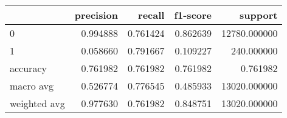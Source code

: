 \begin{tabular}{lrrrr}
\toprule
{} &  precision &    recall &  f1-score &       support \\
\midrule
0            &   0.994888 &  0.761424 &  0.862639 &  12780.000000 \\
1            &   0.058660 &  0.791667 &  0.109227 &    240.000000 \\
accuracy     &   0.761982 &  0.761982 &  0.761982 &      0.761982 \\
macro avg    &   0.526774 &  0.776545 &  0.485933 &  13020.000000 \\
weighted avg &   0.977630 &  0.761982 &  0.848751 &  13020.000000 \\
\bottomrule
\end{tabular}
